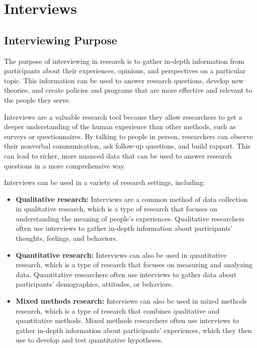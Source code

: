 \documentclass[
  b5paper]{book}
\begin{document}
\hypertarget{interviews-1}{%
\chapter{Interviews}\label{interviews-1}}

\hypertarget{interviewing-purpose}{%
\section{Interviewing Purpose}\label{interviewing-purpose}}

The purpose of interviewing in research is to gather in-depth information from participants about their experiences, opinions, and perspectives on a particular topic. This information can be used to answer research questions, develop new theories, and create policies and programs that are more effective and relevant to the people they serve.

Interviews are a valuable research tool because they allow researchers to get a deeper understanding of the human experience than other methods, such as surveys or questionnaires. By talking to people in person, researchers can observe their nonverbal communication, ask follow-up questions, and build rapport. This can lead to richer, more nuanced data that can be used to answer research questions in a more comprehensive way.

Interviews can be used in a variety of research settings, including:

\begin{itemize}
\item
  \textbf{Qualitative research:} Interviews are a common method of data collection in qualitative research, which is a type of research that focuses on understanding the meaning of people's experiences. Qualitative researchers often use interviews to gather in-depth information about participants' thoughts, feelings, and behaviors.
\item
  \textbf{Quantitative research:} Interviews can also be used in quantitative research, which is a type of research that focuses on measuring and analyzing data. Quantitative researchers often use interviews to gather data about participants' demographics, attitudes, or behaviors.
\item
  \textbf{Mixed methods research:} Interviews can also be used in mixed methods research, which is a type of research that combines qualitative and quantitative methods. Mixed methods researchers often use interviews to gather in-depth information about participants' experiences, which they then use to develop and test quantitative hypotheses.
\end{itemize}
\end{document}
